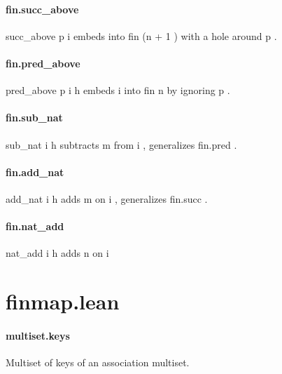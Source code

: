 \documentclass{article}
\begin{document}
\paragraph{fin.succ\_above}
\par
\colorbox[RGB]{253,246,227}{{{{\color[RGB]{101, 123, 131} succ\_above p i }}}} embeds into 
\colorbox[RGB]{253,246,227}{{{{\color[RGB]{101, 123, 131} fin (n  }}}{{{\color[RGB]{181, 137, 0} + }}}{{{\color[RGB]{101, 123, 131}   }}}{{{\color[RGB]{108, 113, 196} 1 }}}{{{\color[RGB]{101, 123, 131} ) }}}} with a hole around 
\colorbox[RGB]{253,246,227}{{{{\color[RGB]{101, 123, 131} p }}}}.
\paragraph{fin.pred\_above}
\par
\colorbox[RGB]{253,246,227}{{{{\color[RGB]{101, 123, 131} pred\_above p i h }}}} embeds 
\colorbox[RGB]{253,246,227}{{{{\color[RGB]{101, 123, 131} i }}}} into 
\colorbox[RGB]{253,246,227}{{{{\color[RGB]{101, 123, 131} fin n }}}} by ignoring 
\colorbox[RGB]{253,246,227}{{{{\color[RGB]{101, 123, 131} p }}}}.
\paragraph{fin.sub\_nat}
\par
\colorbox[RGB]{253,246,227}{{{{\color[RGB]{101, 123, 131} sub\_nat i h }}}} subtracts 
\colorbox[RGB]{253,246,227}{{{{\color[RGB]{101, 123, 131} m }}}} from 
\colorbox[RGB]{253,246,227}{{{{\color[RGB]{101, 123, 131} i }}}}, generalizes 
\colorbox[RGB]{253,246,227}{{{{\color[RGB]{101, 123, 131} fin.pred }}}}.
\paragraph{fin.add\_nat}
\par
\colorbox[RGB]{253,246,227}{{{{\color[RGB]{101, 123, 131} add\_nat i h }}}} adds 
\colorbox[RGB]{253,246,227}{{{{\color[RGB]{101, 123, 131} m }}}} on 
\colorbox[RGB]{253,246,227}{{{{\color[RGB]{101, 123, 131} i }}}}, generalizes 
\colorbox[RGB]{253,246,227}{{{{\color[RGB]{101, 123, 131} fin.succ }}}}.
\paragraph{fin.nat\_add}
\par
\colorbox[RGB]{253,246,227}{{{{\color[RGB]{101, 123, 131} nat\_add i h }}}} adds 
\colorbox[RGB]{253,246,227}{{{{\color[RGB]{101, 123, 131} n }}}} on 
\colorbox[RGB]{253,246,227}{{{{\color[RGB]{101, 123, 131} i }}}}\section{finmap.lean}\paragraph{multiset.keys}
\par
Multiset of keys of an association multiset.
\end{document}
